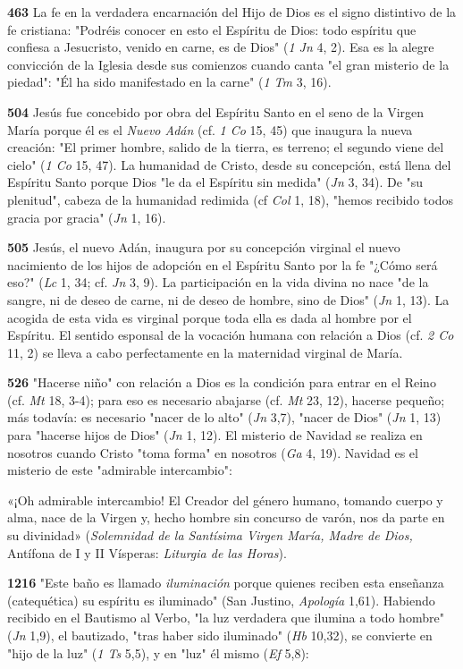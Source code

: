 \documentclass[]{article}
\begin{document}
\textbf{463} La fe en la verdadera encarnación del Hijo de Dios es el
signo distintivo de la fe cristiana: "Podréis conocer en esto el
Espíritu de Dios: todo espíritu que confiesa a Jesucristo, venido en
carne, es de Dios" (\emph{1 Jn} 4, 2). Esa es la alegre convicción de la
Iglesia desde sus comienzos cuando canta "el gran misterio de la
piedad": "Él ha sido manifestado en la carne" (\emph{1 Tm} 3, 16).

\textbf{504} Jesús fue concebido por obra del Espíritu Santo en el seno
de la Virgen María porque él es el \emph{Nuevo Adán} (cf. \emph{1 Co}
15, 45) que inaugura la nueva creación: "El primer hombre, salido de la
tierra, es terreno; el segundo viene del cielo" (\emph{1 Co} 15, 47). La
humanidad de Cristo, desde su concepción, está llena del Espíritu Santo
porque Dios "le da el Espíritu sin medida" (\emph{Jn} 3, 34). De "su
plenitud", cabeza de la humanidad redimida (cf \emph{Col} 1, 18), "hemos
recibido todos gracia por gracia" (\emph{Jn} 1, 16).

\textbf{505} Jesús, el nuevo Adán, inaugura por su concepción virginal
el nuevo nacimiento de los hijos de adopción en el Espíritu Santo por la
fe "¿Cómo será eso?" (\emph{Lc} 1, 34; cf. \emph{Jn} 3, 9). La
participación en la vida divina no nace "de la sangre, ni de deseo de
carne, ni de deseo de hombre, sino de Dios" (\emph{Jn} 1, 13). La
acogida de esta vida es virginal porque toda ella es dada al hombre por
el Espíritu. El sentido esponsal de la vocación humana con relación a
Dios (cf. \emph{2 Co} 11, 2) se lleva a cabo perfectamente en la
maternidad virginal de María.

\textbf{526} "Hacerse niño" con relación a Dios es la condición para
entrar en el Reino (cf. \emph{Mt} 18, 3-4); para eso es necesario
abajarse (cf. \emph{Mt} 23, 12), hacerse pequeño; más todavía: es
necesario "nacer de lo alto" (\emph{Jn} 3,7), "nacer de Dios" (\emph{Jn}
1, 13) para "hacerse hijos de Dios" (\emph{Jn} 1, 12). El misterio de
Navidad se realiza en nosotros cuando Cristo "toma forma" en nosotros
(\emph{Ga} 4, 19). Navidad es el misterio de este "admirable
intercambio":

«¡Oh admirable intercambio! El Creador del género humano, tomando cuerpo
y alma, nace de la Virgen y, hecho hombre sin concurso de varón, nos da
parte en su divinidad» (\emph{Solemnidad de la Santísima Virgen María,
Madre de Dios,} Antífona de I y II Vísperas: \emph{Liturgia de las
Horas}).

\textbf{1216} "Este baño es llamado \emph{iluminación} porque quienes
reciben esta enseñanza (catequética) su espíritu es iluminado" (San
Justino, \emph{Apología} 1,61). Habiendo recibido en el Bautismo al
Verbo, "la luz verdadera que ilumina a todo hombre" (\emph{Jn} 1,9), el
bautizado, "tras haber sido iluminado" (\emph{Hb} 10,32), se convierte
en "hijo de la luz" (\emph{1 Ts} 5,5), y en "luz" él mismo (\emph{Ef}
5,8):
\end{document}

